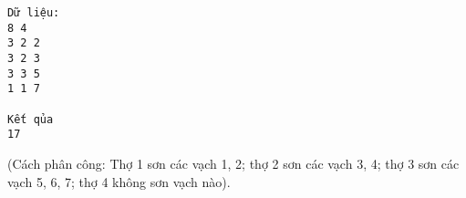 \begin{verbatim}
Dữ liệu:
8 4
3 2 2
3 2 3
3 3 5
1 1 7  

Kết qủa
17
\end{verbatim}

   (Cách phân công: Thợ 1 sơn các vạch 1, 2; thợ 2 sơn các vạch 3, 4; thợ 3 sơn các vạch 5, 6, 7; thợ 4 không sơn vạch nào).